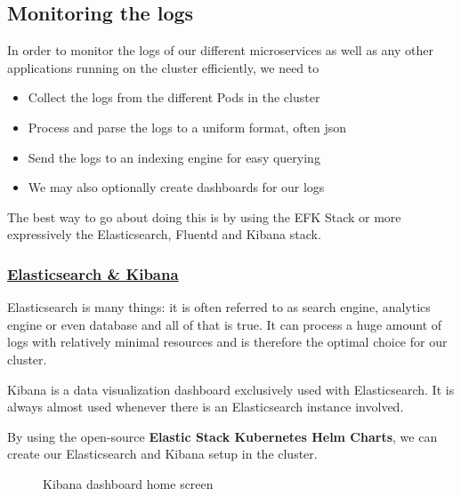 \subsection{Monitoring the logs}
In order to monitor the logs of our different microservices as well as any other applications running on the cluster efficiently, we need to

\begin{itemize}
    \item Collect the logs from the different Pods in the cluster
    \item Process and parse the logs to a uniform format, often json
    \item Send the logs to an indexing engine for easy querying
    \item We may also optionally create dashboards for our logs
\end{itemize}
The best way to go about doing this is by using the EFK Stack or more expressively the Elasticsearch, Fluentd and Kibana stack.

\subsubsection*{\underline{Elasticsearch \& Kibana}}
Elasticsearch is many things: it is often referred to as search engine, analytics engine or even database and all of that is true.
It can process a huge amount of logs with relatively minimal resources and is therefore the optimal choice for our cluster.

Kibana is a data visualization dashboard exclusively used with Elasticsearch.
It is always almost used whenever there is an Elasticsearch instance involved.

By using the open-source \textbf{Elastic Stack Kubernetes Helm Charts}, we can create our Elasticsearch and Kibana setup in the cluster.
\begin{figure}[H]
    \centering
    \caption{Kibana dashboard home screen}
    \label{fig:kibana-dashboard-home}
\end{figure}

